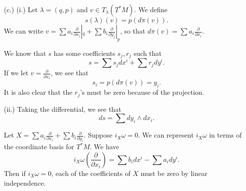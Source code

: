 \documentclass[11pt, reqno]{article}
\theoremstyle{plain}
\theoremstyle{definition}
\theoremstyle{remark}
\begin{document}
\begin{enumerate}
    (c.) (i.) Let $\lambda = (q,p)$ and $v \in T_\lambda(T^*M)$. We define 
    \[
        s(\lambda)(v) = p(d\pi(v)).
    \]
    We can write $v = \sum a_i \frac{\partial}{\partial x_i}|_q + \sum b_i \frac{\partial}{\partial y_j}|_p$, so
    that $d\pi(v) = \sum a_i \frac{\partial}{\partial x_i}$. 

    We know that $s$ has some coefficients $s_j, r_j$ such that 
    \[
        s = \sum s_j dx^i + \sum r_j dy^i.
    \]
    If we let $v = \frac{\partial}{\partial x_i}$, we see that 
    \[
        s_i = p(d\pi(v)) = y_i.
    \]
    It is also clear that the $r_j$'s must be zero because of the projection. 

    (ii.) Taking the differential, we see that
    \[
        ds = \sum dy_i \wedge dx_i.
    \]

    Let $X = \sum a_i \frac{\partial}{\partial x_i} + \sum b_i \frac{\partial}{\partial y_i}$. 
    Suppose $i_X \omega = 0$. We can represent $i_X \omega$ in terms of the coordinate basis 
    for $T^*M$. We have 
    \[
        i_X\omega(\frac{\partial}{\partial x_i}) = \sum b_i dx^i - \sum a_i dy^i.
    \]
    Then if $i_X \omega = 0$, each of the coefficients of $X$ must be zero by linear independence. 

\end{enumerate}
\end{document}
